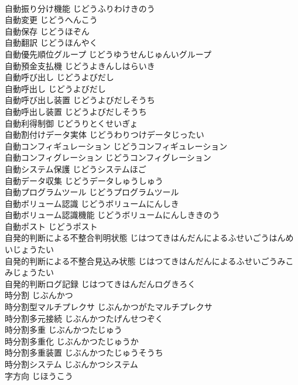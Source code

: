 \documentclass[8pt]{extreport}
\begin{document}
\begin{CJK}{UTF8}{min}
\\	自動振り分け機能	じどうふりわけきのう	
\\	自動変更	じどうへんこう	
\\	自動保存	じどうほぞん	
\\	自動翻訳	じどうほんやく	
\\	自動優先順位グループ	じどうゆうせんじゅんいグループ	
\\	自動預金支払機	じどうよきんしはらいき	
\\	自動呼び出し	じどうよびだし	
\\	自動呼出し	じどうよびだし	
\\	自動呼び出し装置	じどうよびだしそうち	
\\	自動呼出し装置	じどうよびだしそうち	
\\	自動利得制御	じどうりとくせいぎょ	
\\	自動割付けデータ実体	じどうわりつけデータじったい	
\\	自動コンフィギュレーション	じどうコンフィギュレーション	
\\	自動コンフィグレーション	じどうコンフィグレーション	
\\	自動システム保護	じどうシステムほご	
\\	自動データ収集	じどうデータしゅうしゅう	
\\	自動プログラムツール	じどうプログラムツール	
\\	自動ボリューム認識	じどうボリュームにんしき	
\\	自動ボリューム認識機能	じどうボリュームにんしききのう	
\\	自動ポスト	じどうポスト	
\\	自発的判断による不整合判明状態	じはつてきはんだんによるふせいごうはんめいじょうたい	
\\	自発的判断による不整合見込み状態	じはつてきはんだんによるふせいごうみこみじょうたい	
\\	自発的判断ログ記録	じはつてきはんだんログきろく	
\\	時分割	じぶんかつ	
\\	時分割型マルチプレクサ	じぶんかつがたマルチプレクサ	
\\	時分割多元接続	じぶんかつたげんせつぞく	
\\	時分割多重	じぶんかつたじゅう	
\\	時分割多重化	じぶんかつたじゅうか	
\\	時分割多重装置	じぶんかつたじゅうそうち	
\\	時分割システム	じぶんかつシステム	
\\	字方向	じほうこう	

\end{CJK}
\end{document}
